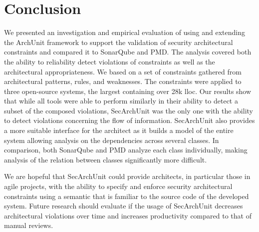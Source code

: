 \chapter{Conclusion}
We presented an investigation and empirical evaluation of using and extending the ArchUnit framework to support the validation of security architectural constraints and compared it to SonarQube and PMD. The analysis covered both the ability to reliability detect violations of constraints as well as the architectural appropriateness. We based on a set of constraints gathered from architectural patterns, rules, and weaknesses. The constraints were applied to three open-source systems, the largest containing over 28k lloc. Our results show that while all tools were able to perform similarly in their ability to detect a subset of the composed violations, SecArchUnit was the only one with the ability to detect violations concerning the flow of information.  SecArchUnit also provides a more suitable interface for the architect as it builds a model of the entire system allowing analysis on the dependencies across several classes. In comparison, both SonarQube and PMD analyze each class individually, making analysis of the relation between classes significantly more difficult. 

We are hopeful that SecArchUnit could provide architects, in particular those in agile projects, with the ability to specify and enforce security architectural constraints using a semantic that is familiar to the source code of the developed system. Future research should evaluate if the usage of SecArchUnit decreases architectural violations over time and increases productivity compared to that of manual reviews. 

